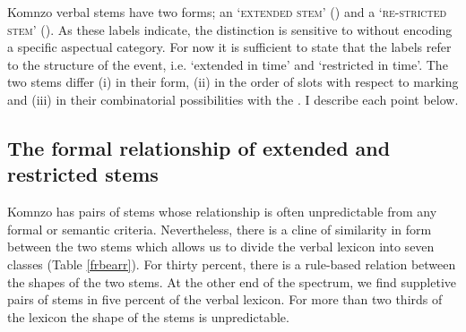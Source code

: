 Komnzo verbal stems have two forms; an `\textsc{extended stem}' (\Ext) and a `\textsc{re-stricted stem}' (\Rs). As these labels indicate, the distinction is sensitive to  without encoding a specific aspectual category. For now it is sufficient to state that the labels refer to the  structure of the event, i.e. `extended in time' and `restricted in time'. The two stems differ (i) in their form, (ii) in the order of slots with respect to  marking and (iii) in their combinatorial possibilities with the . I describe each point below.

\subsection{The formal relationship of extended and restricted stems} \label{formalrelationshipextrs}

Komnzo has pairs of  stems whose relationship is often unpredictable from any formal or semantic criteria. Nevertheless, there is a cline of similarity in form between the two stems which allows us to divide the verbal lexicon into seven classes (Table \ref{frbearr}). For thirty percent, there is a rule-based relation between the shapes of the two stems. At the other end of the spectrum, we find suppletive pairs of stems in five percent of the verbal lexicon. For more than two thirds of the lexicon the shape of the stems is unpredictable.%

